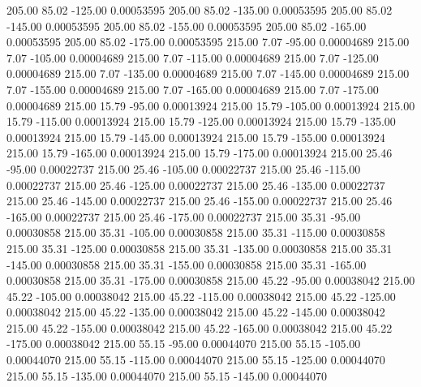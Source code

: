     205.00     85.02   -125.00     0.00053595
    205.00     85.02   -135.00     0.00053595
    205.00     85.02   -145.00     0.00053595
    205.00     85.02   -155.00     0.00053595
    205.00     85.02   -165.00     0.00053595
    205.00     85.02   -175.00     0.00053595
    215.00      7.07    -95.00     0.00004689
    215.00      7.07   -105.00     0.00004689
    215.00      7.07   -115.00     0.00004689
    215.00      7.07   -125.00     0.00004689
    215.00      7.07   -135.00     0.00004689
    215.00      7.07   -145.00     0.00004689
    215.00      7.07   -155.00     0.00004689
    215.00      7.07   -165.00     0.00004689
    215.00      7.07   -175.00     0.00004689
    215.00     15.79    -95.00     0.00013924
    215.00     15.79   -105.00     0.00013924
    215.00     15.79   -115.00     0.00013924
    215.00     15.79   -125.00     0.00013924
    215.00     15.79   -135.00     0.00013924
    215.00     15.79   -145.00     0.00013924
    215.00     15.79   -155.00     0.00013924
    215.00     15.79   -165.00     0.00013924
    215.00     15.79   -175.00     0.00013924
    215.00     25.46    -95.00     0.00022737
    215.00     25.46   -105.00     0.00022737
    215.00     25.46   -115.00     0.00022737
    215.00     25.46   -125.00     0.00022737
    215.00     25.46   -135.00     0.00022737
    215.00     25.46   -145.00     0.00022737
    215.00     25.46   -155.00     0.00022737
    215.00     25.46   -165.00     0.00022737
    215.00     25.46   -175.00     0.00022737
    215.00     35.31    -95.00     0.00030858
    215.00     35.31   -105.00     0.00030858
    215.00     35.31   -115.00     0.00030858
    215.00     35.31   -125.00     0.00030858
    215.00     35.31   -135.00     0.00030858
    215.00     35.31   -145.00     0.00030858
    215.00     35.31   -155.00     0.00030858
    215.00     35.31   -165.00     0.00030858
    215.00     35.31   -175.00     0.00030858
    215.00     45.22    -95.00     0.00038042
    215.00     45.22   -105.00     0.00038042
    215.00     45.22   -115.00     0.00038042
    215.00     45.22   -125.00     0.00038042
    215.00     45.22   -135.00     0.00038042
    215.00     45.22   -145.00     0.00038042
    215.00     45.22   -155.00     0.00038042
    215.00     45.22   -165.00     0.00038042
    215.00     45.22   -175.00     0.00038042
    215.00     55.15    -95.00     0.00044070
    215.00     55.15   -105.00     0.00044070
    215.00     55.15   -115.00     0.00044070
    215.00     55.15   -125.00     0.00044070
    215.00     55.15   -135.00     0.00044070
    215.00     55.15   -145.00     0.00044070
